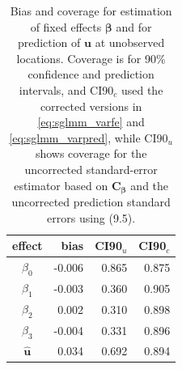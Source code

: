 \documentclass[12pt, titlepage]{article}
\begin{document}
\begin{table}[H] 
	\caption{Bias and coverage for estimation of fixed effects $\boldsymbol{\beta}$ and for prediction of $\mathbf{u}$ at unobserved locations.  Coverage is for 90\% confidence and prediction intervals, and CI90$_{c}$ used the corrected versions in \eqref{eq:sglmm_varfe} and \eqref{eq:sglmm_varpred}, while CI90$_{u}$ shows coverage for the uncorrected standard-error estimator based on $\mathbf{C}_{\boldsymbol{\beta}}$ and the uncorrected prediction standard errors using (9.5).  \label{tab:sglm_fe}}
\begin{center}
\begin{tabular}{|c|rrr|}
\hline
\hline
effect & bias & CI90$_{u}$ & CI90$_{c}$ \\
\hline{}
$\beta_{0}$ & -0.006 & 0.865 & 0.875 \\ 
$\beta_{1}$ &    -0.003 & 0.360 & 0.905 \\ 
$\beta_{2}$ &   0.002 & 0.310 & 0.898 \\ 
$\beta_{3}$ &   -0.004 & 0.331 & 0.896 \\ 
$\hat{\mathbf{u}}$ &   0.034 & 0.692 & 0.894 \\  
\hline
\hline
\end{tabular}
\end{center}
\end{table}



%


%
%
\end{document}
